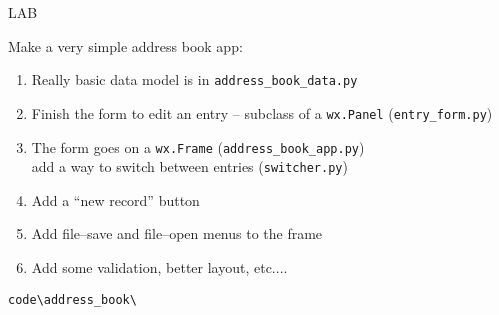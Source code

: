 \documentclass{beamer}
\begin{document}
\begin{frame}[fragile]{LAB}

\vfill
{\Large Make a very simple address book app:}

\begin{enumerate}
 \item Really basic data model is in \verb`address_book_data.py`
 \item Finish the form to edit an entry -- subclass of a \verb`wx.Panel` (\verb`entry_form.py`)
 \item The form goes on a \verb`wx.Frame` (\verb`address_book_app.py`) \\
       add a way to switch between entries (\verb`switcher.py`)
 \item Add a ``new record'' button
 \item Add file--save and file--open menus to the frame
 \item Add some validation, better layout, etc....
\end{enumerate}

\vfill
\verb`code\address_book\`

\end{frame}
\end{document}
